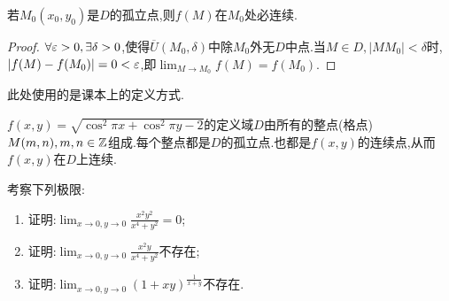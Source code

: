 若$M_0(x_0,y_0)$是$D$的孤立点,则$f(M)$在$M_0$处必连续.

\begin{proof}
    $\forall \varepsilon >0, \exists \delta >0$,使得$\overline U(M_0,\delta)$中除$M_0$外无$D$中点.当$M \in D, | MM_0 | < \delta $时,$|f(M) - f(M_0)| = 0 < \varepsilon$,即$\lim_{M \to M_0} f(M) = f(M_0)$.
\end{proof}

\begin{remark}      
    此处使用的是课本上的定义方式.
\end{remark}

\begin{example}
    $f(x,y) = \sqrt{\cos^2 \pi x + \cos^2 \pi y -2}$的定义域$D$由所有的整点(格点)$M(m,n),m,n \in \mathbb{Z}$组成.每个整点都是$D$的孤立点.也都是$f(x,y)$的连续点,从而$f(x,y)$在$D$上连续.
\end{example}

\begin{example}
    考察下列极限:
    \begin{enumerate}
        \item 证明:$\lim_{x \to 0, y \to 0} \frac{x^2 y^2}{x^4 + y^2} =0$;
        \item 证明:$\lim_{x \to 0, y \to 0} \frac{x^2 y}{x^4 + y^2} $不存在;
        \item 证明:$\lim_{x \to 0, y \to 0} \left( 1 +xy \right)^{\frac{1}{x+y}} $不存在.
    \end{enumerate}
\end{example}

